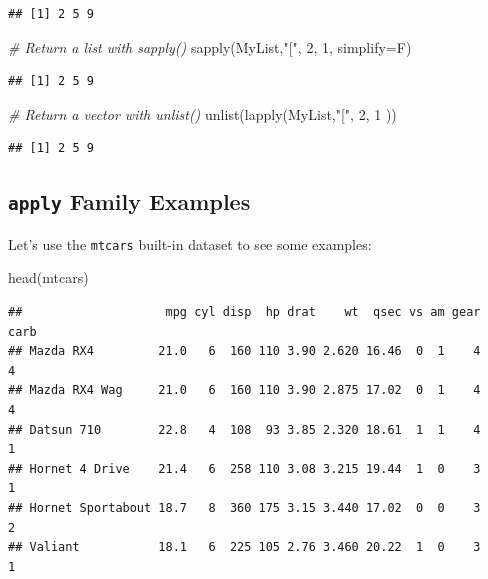 \documentclass[
]{book}
\newenvironment{Shaded}{\begin{snugshade}}{\end{snugshade}}
\newcommand{\AttributeTok}[1]{\textcolor[rgb]{0.77,0.63,0.00}{#1}}
\newcommand{\CommentTok}[1]{\textcolor[rgb]{0.56,0.35,0.01}{\textit{#1}}}
\newcommand{\DecValTok}[1]{\textcolor[rgb]{0.00,0.00,0.81}{#1}}
\newcommand{\FunctionTok}[1]{\textcolor[rgb]{0.00,0.00,0.00}{#1}}
\newcommand{\NormalTok}[1]{#1}
\newcommand{\StringTok}[1]{\textcolor[rgb]{0.31,0.60,0.02}{#1}}
\theoremstyle{definition}
\theoremstyle{definition}
\theoremstyle{definition}
\theoremstyle{definition}
\theoremstyle{remark}
\begin{document}
\begin{verbatim}
## [1] 2 5 9
\end{verbatim}

\begin{Shaded}
\begin{Highlighting}[]
\CommentTok{\# Return a list with \textasciigrave{}sapply()\textasciigrave{}}
\FunctionTok{sapply}\NormalTok{(MyList,}\StringTok{"["}\NormalTok{, }\DecValTok{2}\NormalTok{, }\DecValTok{1}\NormalTok{, }\AttributeTok{simplify=}\NormalTok{F)}
\end{Highlighting}
\end{Shaded}

\begin{verbatim}
## [1] 2 5 9
\end{verbatim}

\begin{Shaded}
\begin{Highlighting}[]
\CommentTok{\# Return a vector with \textasciigrave{}unlist()\textasciigrave{}}
\FunctionTok{unlist}\NormalTok{(}\FunctionTok{lapply}\NormalTok{(MyList,}\StringTok{"["}\NormalTok{, }\DecValTok{2}\NormalTok{, }\DecValTok{1}\NormalTok{ ))}
\end{Highlighting}
\end{Shaded}

\begin{verbatim}
## [1] 2 5 9
\end{verbatim}

\hypertarget{apply-family-examples}{%
\subsection{\texorpdfstring{\texttt{apply} Family Examples}{apply Family Examples}}\label{apply-family-examples}}

Let's use the \texttt{mtcars} built-in dataset to see some examples:

\begin{Shaded}
\begin{Highlighting}[]
\FunctionTok{head}\NormalTok{(mtcars)}
\end{Highlighting}
\end{Shaded}

\begin{verbatim}
##                    mpg cyl disp  hp drat    wt  qsec vs am gear carb
## Mazda RX4         21.0   6  160 110 3.90 2.620 16.46  0  1    4    4
## Mazda RX4 Wag     21.0   6  160 110 3.90 2.875 17.02  0  1    4    4
## Datsun 710        22.8   4  108  93 3.85 2.320 18.61  1  1    4    1
## Hornet 4 Drive    21.4   6  258 110 3.08 3.215 19.44  1  0    3    1
## Hornet Sportabout 18.7   8  360 175 3.15 3.440 17.02  0  0    3    2
## Valiant           18.1   6  225 105 2.76 3.460 20.22  1  0    3    1
\end{verbatim}
\end{document}
